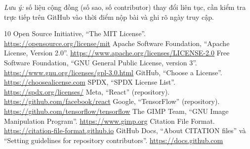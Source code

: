 \documentclass[12pt,a4paper]{article}
\begin{document}
\medskip
\noindent\textit{Lưu ý:} số liệu cộng đồng (số sao, số contributor) thay đổi liên tục, cần kiểm tra trực tiếp trên GitHub vào thời điểm nộp bài và ghi rõ ngày truy cập.

\begin{thebibliography}{10}
 Open Source Initiative, ``The MIT License''. \url{https://opensource.org/license/mit}
 Apache Software Foundation, ``Apache License, Version 2.0''. \url{https://www.apache.org/licenses/LICENSE-2.0}
 Free Software Foundation, ``GNU General Public License, version 3''. \url{https://www.gnu.org/licenses/gpl-3.0.html}
 GitHub, ``Choose a License''. \url{https://choosealicense.com}
 SPDX, ``SPDX License List''. \url{https://spdx.org/licenses/}
 Meta, ``React'' (repository). \url{https://github.com/facebook/react}
 Google, ``TensorFlow'' (repository). \url{https://github.com/tensorflow/tensorflow}
 The GIMP Team, ``GNU Image Manipulation Program''. \url{https://www.gimp.org}
 Citation File Format. \url{https://citation-file-format.github.io}
 GitHub Docs, ``About CITATION files'' và ``Setting guidelines for repository contributors''. \url{https://docs.github.com}
\end{thebibliography}
\end{document}
